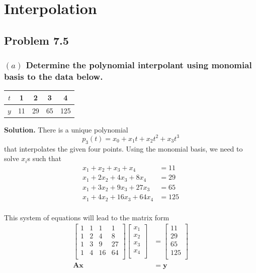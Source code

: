 \section{Interpolation}
\subsection{Problem 7.5}
\subsubsection*{$(a)$ Determine the polynomial interpolant using monomial basis to the data below.}

\begin{table}[H]
	\centering
	\begin{tabular}{c | cccc}
		$t$ & 1 & 2 & 3 & 4 \\\hline
		$y$ & 11 & 29 & 65 & 125 \\
	\end{tabular}
\end{table}

\textbf{Solution.} There is a unique polynomial
\begin{equation*}
p_3(t) = x_0 + x_1t + x_2t^2 + x_3t^3
\end{equation*}
that interpolates the given four points. Using the monomial basis, we need to solve $x_i$s such that
\begin{align*}
x_1 + x_2 + x_3 + x_4 &= 11 \\
x_1 + 2x_2 + 4x_3 + 8x_4 &= 29 \\
x_1 + 3x_2 + 9x_3 + 27x_3 &= 65 \\
x_1 + 4x_2 + 16x_3 + 64x_4 &= 125 \\
\end{align*}

This system of equations will lead to the matrix form
\begin{align*}
\begin{bmatrix}
	1 & 1 & 1 & 1 \\
	1 & 2 & 4 & 8 \\
	1 & 3 & 9 & 27 \\
	1 & 4 & 16 & 64 \\
\end{bmatrix}
\begin{bmatrix}
	x_1 \\
	x_2 \\
	x_3 \\
	x_4 \\
\end{bmatrix}
&=
\begin{bmatrix}
	11 \\
	29 \\
	65 \\
	125 \\
\end{bmatrix}\\
\mathbf{Ax} &= \mathbf{y}
\end{align*}

